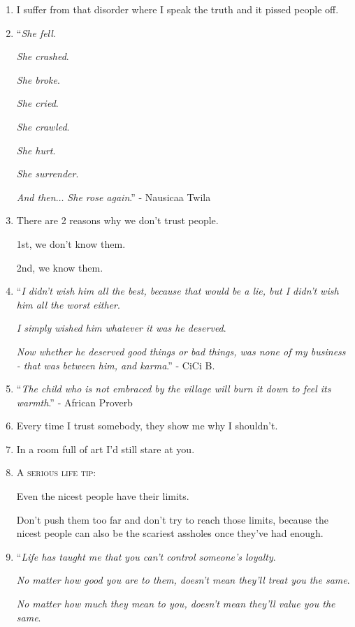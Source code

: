 \documentclass{article}
\numberwithin{equation}{section}
\begin{document}
\begin{enumerate}
    And I came down from the stars.
    \item I suffer from that disorder where I speak the truth and it pissed people off.
    \item ``\textit{She fell}.
    
    \textit{She crashed}.
    
    \textit{She broke}.
    
    \textit{She cried}.
    
    \textit{She crawled}.
    
    \textit{She hurt}.
    
    \textit{She surrender}.
    
    \textit{And then$\ldots$ She rose again}.'' - Nausicaa Twila
    \item There are 2 reasons why we don't trust people.
    
    1st, we don't know them.
    
    2nd, we know them.
    \item ``\textit{I didn't wish him all the best, because that would be a lie, but I didn't wish him all the worst either}.
    
    \textit{I simply wished him whatever it was he deserved}.
    
    \textit{Now whether he deserved good things or bad things, was none of my business - that was between him, and karma}.'' - CiCi B.
    \item ``\textit{The child who is not embraced by the village will burn it down to feel its warmth}.'' - African Proverb
    \item Every time I trust somebody, they show me why I shouldn't.
    \item In a room full of art I'd still stare at you.
    \item \textsc{A serious life tip}:
    
    Even the nicest people have their limits.
    
    Don't push them too far and don't try to reach those limits, because the nicest people can also be the scariest assholes once they've had enough.
    \item ``\textit{Life has taught me that you can't control someone's loyalty}.
    
    \textit{No matter how good you are to them, doesn't mean they'll treat you the same}.
    
    \textit{No matter how much they mean to you, doesn't mean they'll value you the same}.
    

\end{enumerate}
\end{document}
